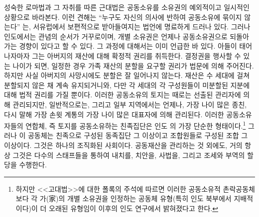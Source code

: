 성숙한 로마법과 그 자취를 따른 근대법은
공동소유를 소유권의 예외적이고 일시적인 상황으로 바라본다.
이런 견해는
``누구도 자신의 의사에 반하여 공동소유에 묶이지 않는다''%
는,
서유럽에서 보편적으로 받아들여지는 법언에 명료하게 드러나 있다.
그러나 인도에서는
관념의 순서가 거꾸로이며,
개별 소유권은 언제나 공동소유권으로 되돌아가는 경향이 있다고 할 수 있다.
그 과정에 대해서는 이미 언급한 바 있다.
아들이 태어나자마자
그는 아버지의 재산에 대해 확정적 권리를 취득한다.
결정권을 행사할 수 있는 나이가 되면,
일정한 경우
가족 재산의 분할을 요구할 권리가
법문에 의해 주어진다.
하지만 사실
아버지의 사망시에도 분할은 잘 일어나지 않는다.
재산은 수 세대에 걸쳐 분할되지 않은 채 계속 유지되거니와,
다만
각 세대의 각 구성원들이 미분할된 지분에 대해 법적 권리를 가질 뿐이다.
이러한 공동소유의 토지는 때로는 선출된 관리자에 의해 관리되지만,
일반적으로는, 그리고 일부 지역에서는 언제나,
가장 나이 많은 종친, 다시 말해
가장 손윗 계통의 가장 나이 많은 대표자에 의해 관리된다.
이러한 공동소유자들의 연합체, 즉
토지를 공동소유하는 친족집단은
인도 의 가장 단순한 형태이다.\footnote{%
  하지만 <<고대법>>에 대한 폴록의 주석에 따르면
  이러한 공동소유적 촌락공동체보다
  각 가(家)의 개별 소유권을 인정하는
  공동체 유형(특히 인도 북부에서 지배적이다)이
  더 오래된 유형임이 이후의 인도 연구에서 밝혀졌다고 한다.
  }
그러나
이 공동체는 친족으로 구성된 동족집단 그 이상이고
조합원들로 구성된 조합 그 이상이다.
그것은 하나의 조직화된 사회이다.
공동재산을 관리하는 것 외에도,
거의 항상 그것은 다수의 스태프들을 통하여
내치를,
치안을,
사법을,
그리고 조세와 부역의 할당을
수행한다.

